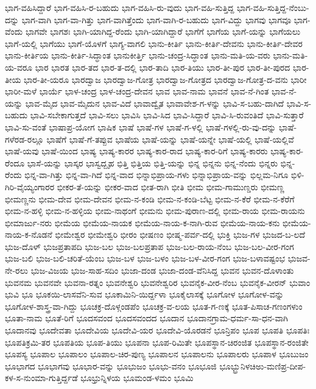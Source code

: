 ಭಾಗ-ವಹಿಸಿದ್ದಾರೆ
ಭಾಗ-ವಹಿಸಿ-ರ-ಬಹುದು
ಭಾಗ-ವಹಿಸಿ-ರು-ವುದು
ಭಾಗ-ವಹಿ-ಸುತ್ತಿದ್ದ
ಭಾಗ-ವಹಿ-ಸುತ್ತಿದ್ದ-ನೆಂಬು-ದನ್ನು
ಭಾಗ-ವಾಗಿ
ಭಾಗ-ವಾ-ಗಿತ್ತು
ಭಾಗ-ವಾಗಿತ್ತೆಂದು
ಭಾಗ-ವಾಗಿ-ರ-ಬಹುದು
ಭಾಗ-ವಿದ್ದು
ಭಾಗವು
ಭಾಗವೂ
ಭಾಗ-ವೆಂದು
ಭಾಗವೇ
ಭಾಗಶಃ
ಭಾಗಿ-ಯಾಗಿದ್ದ-ರೆಂದು
ಭಾಗಿ-ಯಾಗಿದ್ದಾರೆ
ಭಾಗೆಗೆ
ಭಾಗೆಯ
ಭಾಗೆ-ಯನ್ನು
ಭಾಗೆಯಲು
ಭಾಗೆ-ಯಲ್ಲಿ
ಭಾಗೆಯು
ಭಾಗೆ-ಯೊಳಗೆ
ಭಾಗ್ಯ-ವಾಗಲಿ
ಭಾನು-ಕೀರ್ತಿ
ಭಾನು-ಕೀರ್ತಿ-ದೇವನು
ಭಾನು-ಕೀರ್ತಿ-ದೇವರ
ಭಾನು-ಕೀರ್ತಿಯ
ಭಾನು-ಕೀರ್ತಿ-ಸಿದ್ಧಾಂತ
ಭಾನುಕೀರ್ತ್ತಿ
ಭಾನು-ಚಂದ್ರ-ಸಿದ್ಧಾಂತ
ಭಾನು-ಮತಿ-ಯ-ವರು
ಭಾನು-ಮತಿ-ಯ-ವರೂ
ಭಾರ
ಭಾರತ
ಭಾರ-ತದ
ಭಾರ-ತ-ದಲ್ಲಿ
ಭಾರ-ತಾದಿ
ಭಾರ-ತಿಯು
ಭಾರ-ತೀ-ಪುರ
ಭಾರ-ತೀ-ಪುರದ
ಭಾರ-ತೀಯ
ಭಾರ-ತೀ-ಯರೂ
ಭಾರದ್ವಾಜ
ಭಾರದ್ವಾಜ-ಗೋತ್ರ
ಭಾರದ್ವಾಜ-ಗೋತ್ರದ
ಭಾರದ್ವಾಜ-ಗೋತ್ರ-ದ-ವನು
ಭಾರೀ
ಭಾರೀ-ಮಳೆ
ಭಾರ್ಯೆ
ಭಾಳ-ಚಂದ್ರ
ಭಾಳ-ಚಂದ್ರ-ದೇವನ
ಭಾವ
ಭಾವ-ನಾಮ
ಭಾವನೆ
ಭಾವ-ನೆ-ಗಿಂತ
ಭಾವ-ನೆ-ಯನ್ನು
ಭಾವ-ಮೈದ
ಭಾವ-ಮೈದುನ
ಭಾವ-ವಿದೆ
ಭಾವಾದ್ವೈತ
ಭಾವಾವೇಶ-ಗ-ಳನ್ನು
ಭಾವಿ-ಸ-ಬಹು-ದಾಗಿದೆ
ಭಾವಿ-ಸ-ಬಹುದು
ಭಾವಿ-ಸಬೇಕಾಗುತ್ತದೆ
ಭಾವಿ-ಸಲು
ಭಾವಿಸಿ
ಭಾವಿ-ಸಿದ
ಭಾವಿ-ಸಿದ್ದಾರೆ
ಭಾವಿ-ಸಿ-ರುವಂತಿದೆ
ಭಾವಿ-ಸುತ್ತಾರೆ
ಭಾವಿ-ಸು-ವಂತೆ
ಭಾಷಾಪ್ರ-ಯೋಗ
ಭಾಷಿಕ
ಭಾಷೆ
ಭಾಷೆ-ಗಳ
ಭಾಷೆ-ಗ-ಳಲ್ಲಿ
ಭಾಷೆ-ಗಳಲ್ಲಿ-ರು-ವು-ದನ್ನು
ಭಾಷೆ-ಗಳೆರಡ-ರಲ್ಲೂ
ಭಾಷೆಗೆ
ಭಾಷೆ-ಗೆ-ತಪ್ಪುವ
ಭಾಷೆಯ
ಭಾಷೆ-ಯನ್ನು
ಭಾಷೆ-ಯನ್ನೇ
ಭಾಷೆ-ಯಲ್ಲಿ
ಭಾಷೆ-ಯಲ್ಲಿವೆ
ಭಾಷೆ-ಯವು
ಭಾಷೆ-ಯಿಂದ
ಭಾಷ್ಯ
ಭಾಷ್ಯ-ಕಾರರ
ಭಾಷ್ಯ-ಕಾರ-ರಾದ
ಭಾಷ್ಯ-ಕಾರ-ರಿಗೆ
ಭಾಷ್ಯ-ಕಾರರು
ಭಾಷ್ಯ-ಕಾರ-ರೆಂದೂ
ಭಾಸೆ-ಯನ್ನು
ಭಾಸ್ಕರ
ಭಾಸ್ವದ್ಬೃಹ
ಭಿತ್ತಿ
ಭಿತ್ತಿಯ
ಭಿತ್ತಿ-ಯನ್ನು
ಭಿನ್ನ
ಭಿನ್ನನು
ಭಿನ್ನ-ನೆಂದು
ಭಿನ್ನರು
ಭಿನ್ನ-ರೆಂದು
ಭಿನ್ನ-ವಾ-ಗಿತ್ತು
ಭಿನ್ನ-ವಾ-ಗಿದೆ
ಭಿನ್ನ-ವಾದ
ಭಿನ್ನಾಭಿಪ್ರಾಯ-ಗಳು
ಭಿನ್ನಾಭಿಪ್ರಾಯ-ವನ್ನು
ಭಿಲ್ಲಮ-ನಿಗೂ
ಭಿಳಿ-ಗಿರಿ-ವೈಯ್ಯಂಗಾರರ
ಭೀಕರ-ತೆ-ಯನ್ನು
ಭೀಕರ-ವಾದ
ಭೀತ-ರಾಗಿ
ಭೀತಿ
ಭೀಮ
ಭೀಮ-ಗಾಮುಣ್ಡರು
ಭೀಮಣ್ಣ
ಭೀಮಣ್ಣನು
ಭೀಮ-ದೇವ
ಭೀಮ-ದೇವನ
ಭೀಮ-ನ-ಕಂಡಿ
ಭೀಮ-ನ-ಕಂಡಿ-ಬೆಟ್ಟ
ಭೀಮ-ನ-ಕೆರೆ
ಭೀಮ-ನ-ಕೆರೆಗೆ
ಭೀಮ-ನ-ಹಳ್ಳಿ
ಭೀಮ-ನ-ಹಳ್ಳಿಯ
ಭೀಮ-ನಾಥಂಗೆ
ಭೀಮನು
ಭೀಮ-ಪುರಾಣ-ದಲ್ಲಿ
ಭೀಮ-ರಾಯ
ಭೀಮ-ರಾಯನು
ಭೀಮಾರ್ಜು-ನರು
ಭೀಮೆಯ
ಭೀಮೆಯ-ನಾಯಕ
ಭೀಮೆಯ-ನಾಯ-ಕ-ನಾಗಿ-ರುವ
ಭೀಮೆಯ-ನಾಯ-ಕನು
ಭೀಮೆಯ-ನಾಯ-ಕ-ನೊಡನೆ
ಭೀಮೇಶ್ವರ
ಭೀಮೇಶ್ವರಿ
ಭೀರಂ
ಭೀಷಣಂ
ಭೀಷ್ಮ-ಪರ್ವ-ದಲ್ಲಿ
ಭುಕ್ತಿ
ಭುಜ-ಗಳ
ಭುಜದ-ಬ-ಲದೆ
ಭುಜ-ದೊಳ್
ಭುಜಪ್ರತಾಪದಿ
ಭುಜ-ಬಲ
ಭುಜ-ಬಲಪ್ರತಾಪ
ಭುಜ-ಬಲ-ರಾಯ-ನೆಂಬ
ಭುಜ-ಬಲ-ವೀರ-ಗಂಗ
ಭುಜ-ಬಲಿ
ಭುಜ-ಬಲಿ-ಚರಿತೆ-ಯೆಂಬ
ಭುಜ-ಬಳ
ಭುಜ-ಬಳಂ
ಭುಜ-ಬಳ-ವೀರ-ಗಂಗ
ಭುಜ-ಬಳಾವಷ್ಟಂಭ
ಭುಜವ-ನೇ-ರಲು
ಭುಜ-ವಿಜಯ
ಭುಜ-ಸಾಹ-ಸದಿಂ
ಭುಜಾ-ದಂಡ
ಭುಜಾ-ದಂಡ-ವೆನಿಸಿದ್ದ
ಭುವನ
ಭುವನ-ದೊಳಾಂತು
ಭುವನಮ
ಭುವನವೇ
ಭುವನಾ-ರತ್ನಂ
ಭುವನೇಶ್ವರಿ
ಭುವನೇಶ್ವರಿರ
ಭುವನೈಕ-ವೀರ-ನೆಂಬ
ಭುವನೈಕ-ವೀರನ್
ಭುವಾಂ
ಭುವಿ
ಭೂ
ಭೂಕಯಿ-ಲಾಸವೆನಿ-ಸುವ
ಭೂಕಾಮಿನಿ-ಯಿರ್ದ್ದಳಾ
ಭೂಕೈಲಾಸಕ್ಕೆ
ಭೂಗೋಳ
ಭೂಗೋಳ-ವನ್ನು
ಭೂಗೋಳ-ಶಾಸ್ತ್ರ-ವಾ-ಗಿದ್ದು
ಭೂಚಕ್ರ-ದೊಳ್ಗಂಡಪೆಂ
ಭೂಚಕ್ರ-ವ-ಲಯ
ಭೂತ-ಗ-ಣಕ್ಕೆ
ಭೂತ-ಪಿಸಾಚ-ಗಣಂಗಳುಂ
ಭೂತಾ-ನಾಮ
ಭೂತೆ-ರಿಗೆ
ಭೂದಸವಂದ
ಭೂದಸವಂದದ
ಭೂದಾನ
ಭೂದಾನಗ್ರಾಮ-ಧರ್ಮ-ಸಾ-ಧನ-ವಾಗಿ
ಭೂದಾನವು
ಭೂದೇವತಾ
ಭೂದೇವಿಯ
ಭೂದೇವಿ-ಯರ
ಭೂದೇವಿ-ಯೊರಡನೆ
ಭೂನ್ರಿಪಂ
ಭೂಪ
ಭೂಪತಿ
ಭೂಪತಿಃ
ಭೂಪತಿಕ್ರಮಿ-ತರ
ಭೂಪತಿಯ
ಭೂಪ-ತಿಯು
ಭೂಪನಾ
ಭೂಪ-ರಿಮಿತೇ
ಭೂಪಸ್ಥಾನ-ಚಿರಂಜಿತ
ಭೂಪಸ್ಥಾನ-ರಂಜಿತೇ
ಭೂಪಸ್ಯ
ಭೂಪಾಲ
ಭೂಪಾಲಂ
ಭೂಪಾಲ-ಚಿರ-ಪುಣ್ಯ
ಭೂಪಾಲನ
ಭೂಪಾಲನು
ಭೂಪಾಲರು
ಭೂಪಾಳ
ಭೂಬುಜಂ
ಭೂಭಾಗದ
ಭೂಭಾಗವು
ಭೂಭಾರ-ವನ್ನು
ಭೂಭುಜಂ
ಭೂಭು-ವನಂ
ಭೂಭೂಜಿ
ಭೂಭ್ಭ್ರುನಿಳಚಿಅು-ಮಣಿಪ್ರ-ದೀಪ-ಕಳ-ಸ-ನುಂಮಾ-ಗುತ್ತಿರ್ದ್ದಡೆ
ಭೂಭ್ರುನ್ನಿಳಯ
ಭೂಮಂಡ-ಳಮಂ
ಭೂಮಿ
